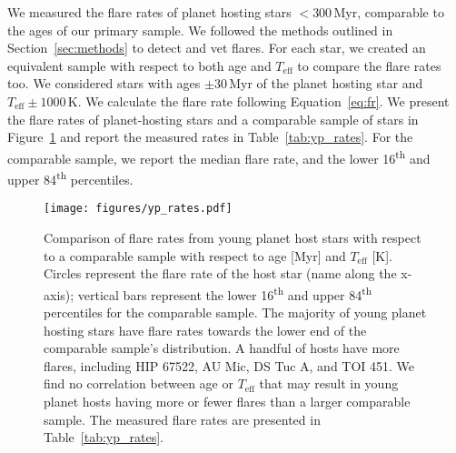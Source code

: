 \documentclass[twocolumn]{aastex631}
\begin{document}
We measured the flare rates of planet hosting stars $< 300$\,Myr, comparable to the ages of our primary sample.
We followed the methods outlined in Section~\ref{sec:methods} to detect and vet flares. For each star, we created
an equivalent sample with respect to both age and $T_\textrm{eff}$ to compare the flare rates too. We considered
stars with ages $\pm 30$\,Myr of the planet hosting star and $T_\textrm{eff} \pm 1000$\,K. We calculate the flare rate
following Equation~\ref{eq:fr}. We present
the flare rates of planet-hosting stars and a comparable sample of stars in Figure~\ref{fig:yp_rates}
and report the measured rates in Table~\ref{tab:yp_rates}. For the comparable sample, we report the
median flare rate, and the lower 16\textsuperscript{th} and upper 84\textsuperscript{th} percentiles.

\begin{figure}[ht!]
    \begin{centering}
        \texttt{[image: figures/yp\_rates.pdf]}
        \caption{
            Comparison of flare rates from young planet host stars with respect to
            a comparable sample with respect to age [Myr] and $T_\textrm{eff}$ [K].
            Circles represent the flare rate of the host star (name along the x-axis);
            vertical bars represent the lower 16\textsuperscript{th} and upper
            84\textsuperscript{th} percentiles for the comparable sample. The majority
            of young planet hosting stars have flare rates towards the lower end of the
            comparable sample's distribution. A handful of hosts have more flares, including
            HIP 67522, AU Mic, DS Tuc A, and TOI 451. We find no correlation between
            age or $T_\textrm{eff}$ that may result in young planet hosts having more or fewer
            flares than a larger comparable sample. The measured flare rates are presented in
            Table~\ref{tab:yp_rates}.
        }
        \label{fig:yp_rates}
    \end{centering}
\end{figure}
\end{document}
